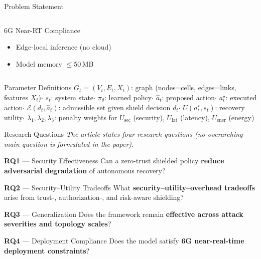 \documentclass[aspectratio=169,10pt]{beamer}
\begin{document}
\begin{frame}[t,shrink=22]{Problem Statement}{}
\begin{columns}[t]
\begin{exampleblock}{6G Near-RT Compliance \cite{oran_official_architecture}}
\begin{itemize}
        \item Edge-local inference (no cloud)
        \item Model memory ${\le}50$\,MB
      \end{itemize}
    \end{exampleblock}
  \end{columns}
  \vspace{0.15cm}
  \begin{block}{Parameter Definitions}
    \scriptsize
    $G_t{=}(V_t,E_t,X_t)$: graph (nodes=cells, edges=links, features $X_t$)\enskip$\cdot$\enskip
    $s_t$: system state\enskip$\cdot$\enskip
    $\pi_\theta$: learned policy\enskip$\cdot$\enskip
    $\hat{a}_t$: proposed action\enskip$\cdot$\enskip
    $a_t^\star$: executed action\enskip$\cdot$\enskip
    $\mathcal{E}(d_t,\hat{a}_t)$: admissible set given shield decision $d_t$\enskip$\cdot$\enskip
    $U(a_t^\star,s_t)$: recovery utility\enskip$\cdot$\enskip
    $\lambda_1,\lambda_2,\lambda_3$: penalty weights for $U_\text{sec}$ (security), $U_\text{lat}$ (latency), $U_\text{ener}$ (energy)
  \end{block}
\end{frame}

\begin{frame}[t,shrink=8]{Research Questions}{}
  \vspace{0.1cm}
  {\footnotesize\textit{The article states four research questions (no overarching main question is formulated in the paper).}}
  \vspace{0.2cm}
  \begin{block}{\textbf{RQ1} — Security Effectiveness}
    Can a zero-trust shielded policy \textbf{reduce adversarial degradation} of autonomous recovery?
  \end{block}
  \vspace{0.2cm}
  \begin{block}{\textbf{RQ2} — Security–Utility Tradeoffs}
    What \textbf{security–utility–overhead tradeoffs} arise from trust-, authorization-, and risk-aware shielding?
  \end{block}
  \vspace{0.2cm}
  \begin{block}{\textbf{RQ3} — Generalization}
    Does the framework remain \textbf{effective across attack severities and topology scales}?
  \end{block}
  \vspace{0.2cm}
  \begin{block}{\textbf{RQ4} — Deployment Compliance}
    Does the model satisfy \textbf{6G near-real-time deployment constraints}?
  \end{block}
\end{frame}
\end{document}

